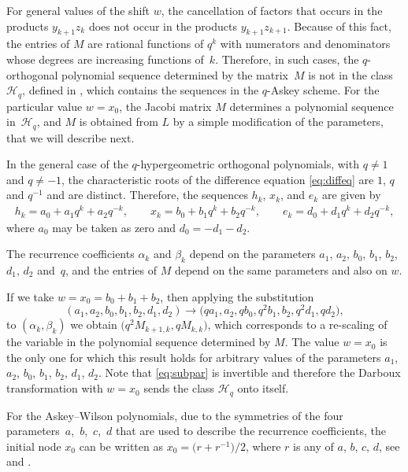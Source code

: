 \documentclass[pdftex]{sigma}
\def\cH{\mathcal H}
\numberwithin{equation}{section}
\begin{document}
For general values of the shift $w$, the cancellation of factors that occurs in the products $y_{k+1} z_k$ does not occur in the products $ y_{k+1} z_{k+1}$. Because of this fact, the entries of $M$ are rational functions of $q^k$ with numerators and denominators whose degrees are increasing functions of~$k$. Therefore, in such cases, the $q$-orthogonal polynomial sequence determined by the matrix~$M$ is not in the class $\cH_q$, defined in \cite[Section~7]{Uni}, which contains the sequences in the $q$-Askey scheme. For the particular value $w=x_0$, the Jacobi matrix $M$ determines a polynomial sequence in~$\cH_q$, and $M$ is obtained from $L$ by a simple modification of the parameters, that we will describe next.

In the general case of the $q$-hypergeometric orthogonal polynomials, with $q\ne 1$ and ${q \ne -1}$, the characteristic roots of the difference equation \eqref{eq:diffeq} are $1$, $q$ and $q^{-1}$ and are distinct.
Therefore, the sequences $h_k$, $ x_k$, and $e_k$ are given by
\begin{gather*} %
h_k= a_0 + a_1 q^k + a_2 q^{-k}, \qquad
	x_k= b_0 + b_1 q^k + b_2 q^{-k}, \qquad
	e_k= d_0 + d_1 q^k + d_2 q^{-k},
\end{gather*}
where $a_0$ may be taken as zero and $d_0=-d_1 -d_2$.

The recurrence coefficients $\alpha_k$ and $\beta_k$ depend on the parameters $a_1$, $a_2$, $b_0$, $b_1$, $b_2$, $d_1$, $d_2$ and~$q$, and the entries of $M$ depend on the same parameters and also on $w$.

If we take $w=x_0=b_0+b_1+b_2$, then applying the substitution
\begin{equation}\label{eq:subpar}
	( a_1, a_2, b_0, b_1, b_2, d_1, d_2)\rightarrow \bigl( q a_1, a_2, q b_0, q^2 b_1, b_2, q^2 d_1, q d_2\bigr),
\end{equation}
to $(\alpha_k, \beta_k)$ we obtain $\bigl( q^2 M_{k+1,k}, q M_{k,k}\bigr)$, which corresponds to a re-scaling of the variable in the polynomial sequence determined by $M$. The value $w=x_0$ is the only one for which this result holds for arbitrary values of the parameters $a_1$, $a_2$, $b_0$, $b_1$, $b_2$, $d_1$, $d_2$. Note that \eqref{eq:subpar} is invertible and therefore the Darboux transformation with $w=x_0$ sends the class $\cH_q$ onto itself.

For the Askey--Wilson polynomials, due to the symmetries of the four parameters~$a$,~$b$,~$c$,~$d$ that are used to describe the recurrence coefficients, the initial node $x_0$ can be written as $x_0=\bigl(r+ r^{-1}\bigr)/2$, where $r$ is any of $a$, $b$, $c$, $d$, see \cite[equation~(14.1.5)]{Hyp} and \cite[equation~(7.15)]{Uni}.
\end{document}
